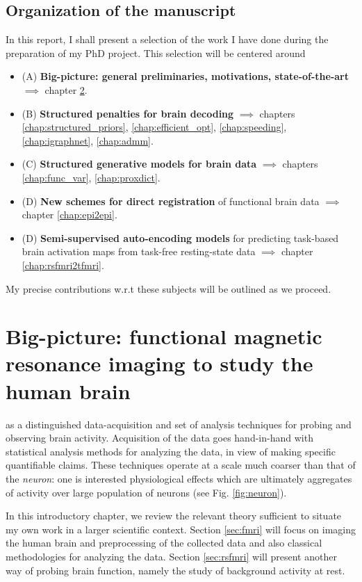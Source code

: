 \section{Organization of the manuscript}
In this report, I shall present a selection of the work I have done during the preparation of my PhD project. This selection will be centered around
\begin{itemize}
\item (A) \textbf{Big-picture: general preliminaries, motivations, state-of-the-art} $\implies$ chapter \ref{chap:bigpic}.
\item (B) \textbf{Structured penalties for brain decoding} $\implies$ chapters \ref{chap:structured_priors}, \ref{chap:efficient_opt}, \ref{chap:speeding}, \ref{chap:igraphnet}, \ref{chap:admm}.
\item (C) \textbf{Structured generative models for brain data} $\implies$ chapters \ref{chap:func_var}, \ref{chap:proxdict}.
\item (D) \textbf{New schemes for direct registration} of functional brain data $\implies$ chapter \ref{chap:epi2epi}.
\item (D) \textbf{Semi-supervised auto-encoding models} for predicting task-based brain activation
  maps from task-free resting-state data $\implies$ chapter \ref{chap:rsfmri2tfmri}.
\end{itemize}
My precise contributions w.r.t these subjects will be outlined  as we proceed.

\chapter{Big-picture: functional magnetic resonance imaging to study the human brain}\label{chap:bigpic}

\minitoc
 
 as a distinguished data-acquisition and set of  analysis techniques for probing and observing brain activity.
Acquisition of the data goes hand-in-hand with
  statistical analysis methods for analyzing the data, in view of making specific quantifiable claims. These techniques operate at a scale much coarser than that of the \textit{neuron}: one is interested physiological effects which are ultimately aggregates of activity over large population of neurons (see Fig. \ref{fig:neuron}).

In this introductory chapter, we review the relevant theory sufficient to situate my own work in a larger scientific context. Section \ref{sec:fmri} will
focus on imaging the human brain and preprocessing of the collected data and also classical methodologies for analyzing the data.
  Section \ref{sec:rsfmri} will present another way of probing brain function,
  namely the study of background activity at rest.


